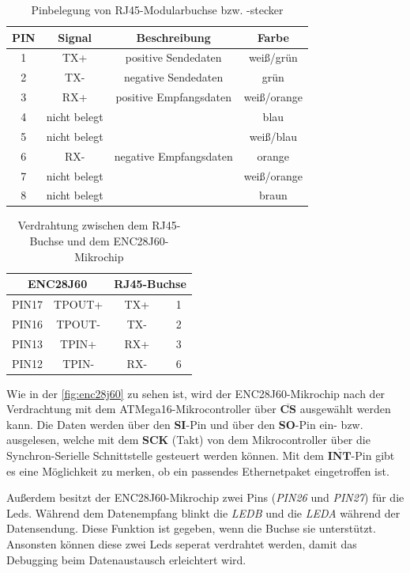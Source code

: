 \begin{table}[htbp]
	\centering
	\begin{tabular}{ |c|c|c|c| } 
	\hline
		PIN & Signal & Beschreibung & Farbe \\ \hline
		1 & TX+ & positive Sendedaten & weiß/grün \\ \hline
		2 & TX- & negative Sendedaten & grün \\ \hline
		3 & RX+ & positive Empfangsdaten & weiß/orange \\ \hline
		4 & nicht belegt &  & blau \\ \hline
		5 & nicht belegt &  & weiß/blau\\ \hline
		6 & RX- & negative Empfangsdaten & orange \\ \hline
		7 & nicht belegt &  & weiß/orange \\ \hline
		8 & nicht belegt &  & braun \\ \hline
	\end{tabular}
	\caption{Pinbelegung von RJ45-Modularbuchse bzw. -stecker \cite{RJ45:Pins}}\label{tab:rj45}
\end{table}

\begin{table}[htbp]
\centering
\begin{tabular}{ |c|c|c|c| }
  \hline
  \multicolumn{2}{|c|}{\textbf{ENC28J60}} & \multicolumn{2}{|c|}{\textbf{RJ45-Buchse}}\\ 
  \hline
  PIN17 & TPOUT+ & TX+ & 1 \\
  PIN16 & TPOUT- & TX- & 2 \\
  PIN13 & TPIN+ & RX+ & 3 \\
  PIN12 & TPIN- & RX- & 6 \\
  \hline
\end{tabular}
\caption{Verdrahtung zwischen dem RJ45-Buchse und dem ENC28J60-Mikrochip}\label{fig:ethernet}
\end{table}

Wie in der \autoref{fig:enc28j60} zu sehen ist, wird der ENC28J60-Mikrochip nach der Verdrachtung mit dem ATMega16-Mikrocontroller über $\overline{\textbf{CS}}$ ausgewählt werden kann. Die Daten werden über den \textbf{SI}-Pin und über den \textbf{SO}-Pin ein- bzw. ausgelesen, welche mit dem \textbf{SCK} (Takt) von dem Mikrocontroller über die Synchron-Serielle Schnittstelle gesteuert werden können. Mit dem $\overline{\textbf{INT}}$-Pin gibt es eine Möglichkeit zu merken, ob ein passendes Ethernetpaket eingetroffen ist. \smallskip \smallskip

Außerdem besitzt der ENC28J60-Mikrochip zwei Pins (\textit{PIN26} und \textit{PIN27}) für die Leds. Während dem Datenempfang blinkt die \textit{LEDB} und die \textit{LEDA} während der Datensendung. Diese Funktion ist gegeben, wenn die Buchse sie unterstützt. Ansonsten können diese zwei Leds seperat verdrahtet werden, damit das Debugging beim Datenaustausch erleichtert wird. 

